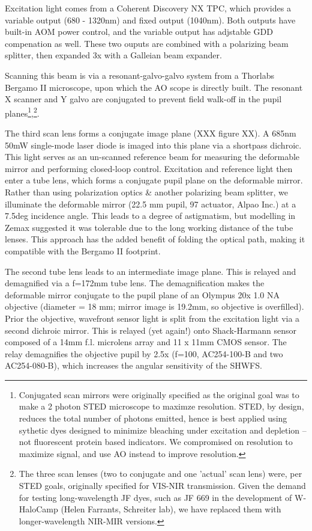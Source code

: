 \documentclass[a4paper,10pt]{article}
\begin{document}
Excitation light comes from a Coherent Discovery NX TPC, which provides a variable output (680 - 1320nm) and fixed output (1040nm).  Both outputs have built-in AOM power control, and the variable output has adjstable GDD compenation as well.  These two ouputs are combined with a polarizing beam splitter, then expanded 3x with a Galleian beam expander.  

Scanning this beam is via a resonant-galvo-galvo system from a Thorlabs Bergamo II microscope, upon which the AO scope is directly built.  The resonant X scanner and Y galvo are conjugated to prevent field walk-off in the pupil planes\footnote{Conjugated scan mirrors were originally specified as the original goal was to make a 2 photon STED microscope to maximze resolution.  STED, by design, reduces the total number of photons emitted, hence is best applied using sythetic dyes designed to minimize bleaching under excitation and depletion -- not fluorescent protein based indicators.  We compromised on resolution to maximize signal, and use AO instead to improve resolution. },\footnote{The three scan lenses (two to conjugate and one 'actual' scan lens) were, per STED goals, originally specified for VIS-NIR transmission.  Given the demand for testing long-wavelength JF dyes, such as JF 669 in the development of W-HaloCamp (Helen Farrants, Schreiter lab), we have replaced them with longer-wavelength NIR-MIR versions.}.  

The third scan lens forms a conjugate image plane (XXX figure XX).  A 685nm 50mW single-mode laser diode is imaged into this plane via a shortpass dichroic.  This light serves as an un-scanned reference beam for measuring the deformable mirror and performing closed-loop control.  Excitation and reference light then enter a tube lens, which forms a conjugate pupil plane on the deformable mirror.  Rather than using polarization optics \& another polarizing beam splitter, we illuminate the deformable mirror (22.5 mm pupil, 97 actuator, Alpao Inc.) at a 7.5deg incidence angle.  This leads to a degree of astigmatism, but modelling in Zemax suggested it was tolerable due to the long working distance of the tube lenses.  This approach has the added benefit of folding the optical path, making it compatible with the Bergamo II footprint.  

The second tube lens leads to an intermediate image plane.  This is relayed and demagnified via a f=172mm tube lens.  The demagnification makes the deformable mirror conjugate to the pupil plane of an Olympus 20x 1.0 NA objective (diameter = 18 mm; mirror image is 19.2mm, so objective is overfilled).  Prior the objective, wavefront sensor light is split from the excitation light via a second dichroic mirror.  This is relayed (yet again!) onto Shack-Harmann sensor composed of a 14mm f.l. microlens array and 11 x 11mm CMOS sensor.  The relay demagnifies the objective pupil by 2.5x (f=100, AC254-100-B and two AC254-080-B), which increases the angular sensitivity of the SHWFS.  
\end{document}
